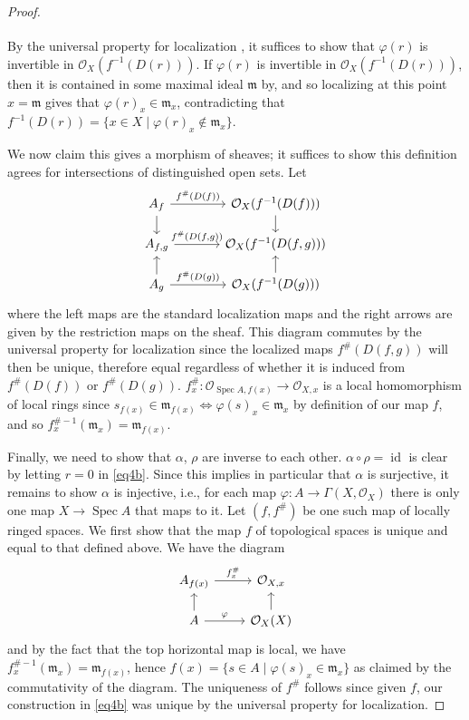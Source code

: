 \documentclass[10pt]{article}
\theoremstyle{definition}
\theoremstyle{remark}
\numberwithin{equation}{section}
\numberwithin{figure}{subsubsection}
\DeclareMathOperator{\Spec}{Spec}
\DeclareMathOperator{\id}{id}
\newcommand{\OO}{\mathcal{O}}
\begin{document}
\begin{proof}
\begin{equation}
\begin{tikzcd}[row sep=scriptsize]
    \end{tikzcd}
  \end{equation}
  By the universal property for localization \cite[Prop.~3.1]{AM69}, it suffices
  to show that $\varphi(r)$ is invertible in $\mathcal{O}_X(f^{-1}(D(r)))$. If
  $\varphi(r)$ is invertible in $\OO_X(f^{-1}(D(r)))$, then it is contained in
  some maximal ideal $\mathfrak{m}$ by, and so localizing at this point $x =
  \mathfrak{m}$ gives that $\varphi(r)_x \in \mathfrak{m}_x$, contradicting that
  $f^{-1}(D(r)) = \{x \in X \mid \varphi(r)_x \notin \mathfrak{m}_x\}$.
  \par We now claim this gives a morphism of sheaves; it suffices to show this definition agrees for intersections of distinguished open sets. Let
  \begin{equation*}
    \begin{tikzcd}[column sep=large,row sep=scriptsize]
      A_f \rar{f^\#(D(f))}\dar & \OO_X(f^{-1}(D(f)))\dar\\
      A_{f,g} \rar{f^\#(D(f,g))} & \OO_X(f^{-1}(D(f,g)))\\
      A_g \rar{f^\#(D(g))}\uar & \OO_X(f^{-1}(D(g)))\uar
    \end{tikzcd}
  \end{equation*}
  where the left maps are the standard localization maps and the right arrows
  are given by the restriction maps on the sheaf. This diagram commutes by the
  universal property for localization since the localized maps $f^\#(D(f,g))$
  will then be unique, therefore equal regardless of whether it is induced from
  $f^\#(D(f))$ or $f^\#(D(g))$. $f^\#_x \colon \OO_{\Spec A,f(x)} \to \OO_{X,x}$ is a local homomorphism of local rings since $s_{f(x)} \in \mathfrak{m}_{f(x)} \iff \varphi(s)_x \in \mathfrak{m}_x$ by definition of our map $f$, and so $f_x^{\#-1}(\mathfrak{m}_x) = \mathfrak{m}_{f(x)}$.
  \par Finally, we need to show that $\alpha$, $\rho$ are inverse to each other.
  $\alpha \circ \rho = \id$ is clear by letting $r=0$ in \eqref{eq4b}. Since this implies in particular that $\alpha$ is surjective, it remains to show $\alpha$ is injective, i.e., for each map $\varphi\colon A \to \Gamma(X,\OO_X)$ there is only one map $X \to \Spec A$ that maps to it. Let $(f,f^\#)$ be one such map of locally ringed spaces. We first show that the map $f$ of topological spaces is unique and equal to that defined above. We have the diagram
  \begin{equation*}
    \begin{tikzcd}[row sep=scriptsize]
      A_{f(x)} \rar{f^\#_x} & \OO_{X,x}\\
      A \uar \rar{\varphi} & \OO_X(X) \uar
    \end{tikzcd}
  \end{equation*}
  and by the fact that the top horizontal map is local, we have
  $f^{\#-1}_x(\mathfrak{m}_x) = \mathfrak{m}_{f(x)}$, hence $f(x) = \{s \in A
    \mid \varphi(s)_x \in \mathfrak{m}_x\}$ as claimed by the commutativity of the diagram. The uniqueness of $f^\#$ follows since given $f$, our construction in \eqref{eq4b} was unique by the universal property for localization.
\end{proof}
\end{document}
